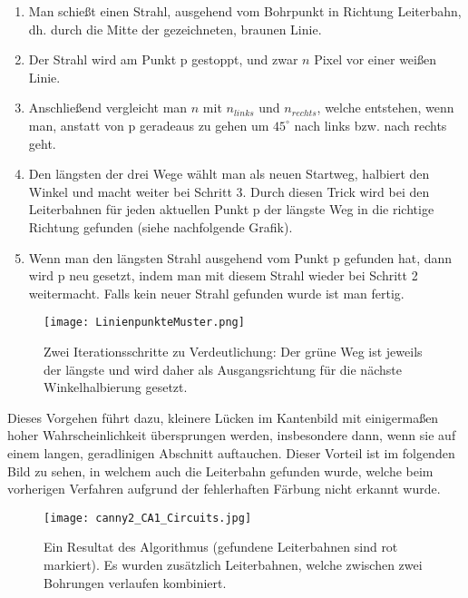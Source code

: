 \begin{enumerate}
\item Man schießt einen Strahl, ausgehend vom Bohrpunkt in Richtung Leiterbahn, dh. durch die Mitte der gezeichneten, braunen Linie.
\item Der Strahl wird am Punkt p gestoppt, und zwar $n$ Pixel vor einer weißen Linie.
\item Anschließend vergleicht man $n$ mit $n_{links}$ und $n_{rechts}$, welche entstehen, wenn man, anstatt von p geradeaus zu gehen um $45^\circ$ nach links bzw. nach rechts geht. 
\item Den längsten der drei Wege wählt man als neuen Startweg, halbiert den Winkel und macht weiter bei Schritt 3. Durch diesen Trick wird bei den Leiterbahnen für jeden aktuellen Punkt p der längste Weg in die richtige Richtung gefunden (siehe nachfolgende Grafik).
\item Wenn man den längsten Strahl ausgehend vom Punkt p gefunden hat, dann wird p neu gesetzt, indem man mit diesem Strahl wieder bei Schritt 2 weitermacht. Falls kein neuer Strahl gefunden wurde ist man fertig.
\end{enumerate}

\begin{figure}[H]
  \begin{center}
    \texttt{[image: LinienpunkteMuster.png]}
    \caption{Zwei Iterationsschritte zu Verdeutlichung: Der grüne Weg ist jeweils der längste und wird daher als Ausgangsrichtung für die nächste Winkelhalbierung gesetzt.}
    \label{fig:linepoints}
  \end{center}
\end{figure}

Dieses Vorgehen führt dazu, kleinere Lücken im Kantenbild mit einigermaßen hoher Wahrscheinlichkeit übersprungen werden, insbesondere dann, wenn sie auf einem langen, geradlinigen Abschnitt auftauchen. Dieser Vorteil ist im folgenden Bild zu sehen, in welchem auch die Leiterbahn gefunden wurde, welche beim vorherigen Verfahren aufgrund der fehlerhaften Färbung nicht erkannt wurde.

\begin{figure}[H]
  \begin{center}
    \texttt{[image: canny2\_CA1\_Circuits.jpg]}
    \caption{Ein Resultat des Algorithmus (gefundene Leiterbahnen sind rot markiert). Es wurden zusätzlich Leiterbahnen, welche zwischen zwei Bohrungen verlaufen kombiniert.}
    \label{fig:linepoints2}
  \end{center}
\end{figure}

